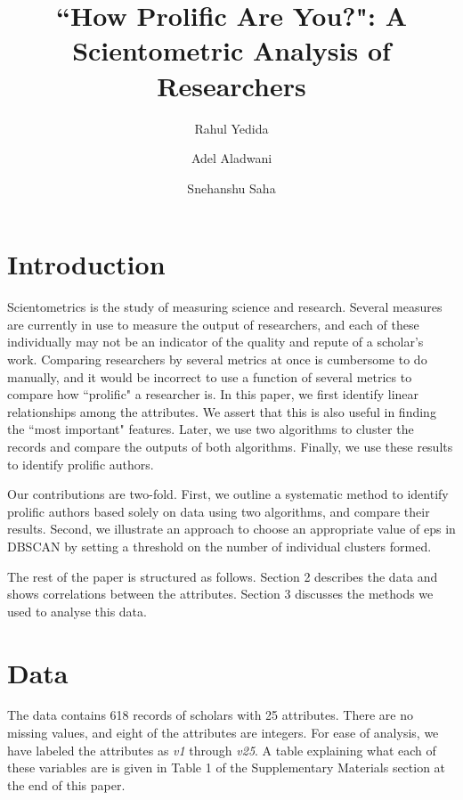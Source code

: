 \documentclass[12pt,a4paper,twocolumn]{article}
\title{``How Prolific Are You?": A Scientometric Analysis of Researchers}
\author[1]{Rahul Yedida}
\author[2]{Adel Aladwani}
\author[1]{Snehanshu Saha}
\affil[1]{Department of Computer Science \& Engineering, PES University}
\affil[2]{Department of Information Systems, Kuwait University}
\date{}
\begin{document}
	\maketitle
	
	
	\section{Introduction}
	Scientometrics is the study of measuring science and research. Several measures are currently in use to measure the output of researchers, and each of these individually may not be an indicator of the quality and repute of a scholar's work. Comparing researchers by several metrics at once is cumbersome to do manually, and it would be incorrect to use a function of several metrics to compare how ``prolific" a researcher is. In this paper, we first identify linear relationships among the attributes. We assert that this is also useful in finding the ``most important" features. Later, we use two algorithms to cluster the records and compare the outputs of both algorithms. Finally, we use these results to identify prolific authors.
	
	Our contributions are two-fold. First, we outline a systematic method to identify prolific authors based solely on data using two algorithms, and compare their results. Second, we illustrate an approach to choose an appropriate value of eps in DBSCAN by setting a threshold on the number of individual clusters formed.
	
	The rest of the paper is structured as follows. Section 2 describes the data and shows correlations between the attributes. Section 3 discusses the methods we used to analyse this data.
	
	\section{Data}
	The data contains 618 records of scholars with 25 attributes. There are no missing values, and eight of the attributes are integers. For ease of analysis, we have labeled the attributes as \textit{v1} through \textit{v25}. A table explaining what each of these variables are is given in Table 1 of the Supplementary Materials section at the end of this paper.
	
\end{document}
